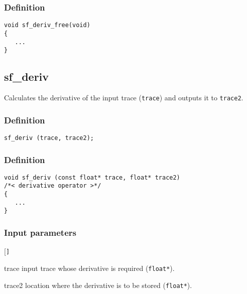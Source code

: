 \subsubsection*{Definition}
\begin{verbatim}
void sf_deriv_free(void)
{
   ...
}
\end{verbatim}




\subsection{{sf\_deriv}}
Calculates the derivative of the input trace (\texttt{trace}) and outputs it to \texttt{trace2}.


\subsubsection*{Definition}
\begin{verbatim}sf_deriv (trace, trace2);\end{verbatim}


\subsubsection*{Definition}
\begin{verbatim}
void sf_deriv (const float* trace, float* trace2)
/*< derivative operator >*/
{
   ...
}
\end{verbatim}


\subsubsection*{Input parameters}
\begin{desclist}{\tt }{\quad}[\tt ]
   \setlength\itemsep{0pt}
   \item[trace] input trace whose derivative is required (\texttt{float*}).  
   \item[trace2] location where the derivative is to be stored (\texttt{float*}).  
\end{desclist}



